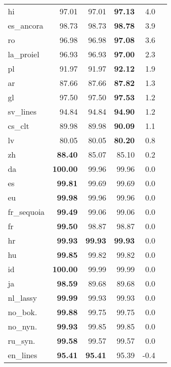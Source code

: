 \documentclass[11pt,a4paper]{article}
\begin{document}
\begin{table}[]
\begin{center}
\begin{tabular}{|l|r||r|r|r|r|}
hi          &      97.01  &     97.01  & \bf 97.13  &      4.0\\
es\_ancora  &      98.73  &     98.73  & \bf 98.78  &      3.9\\
ro          &      96.98  &     96.98  & \bf 97.08  &      3.6\\
la\_proiel  &      96.93  &     96.93  & \bf 97.00  &      2.3\\
pl          &      91.97  &     91.97  & \bf 92.12  &      1.9\\
ar          &      87.66  &     87.66  & \bf 87.82  &      1.3\\
gl          &      97.50  &     97.50  & \bf 97.53  &      1.2\\
sv\_lines   &      94.84  &     94.84  & \bf 94.90  &      1.2\\
cs\_clt     &      89.98  &     89.98  & \bf 90.09  &      1.1\\
lv          &      80.05  &     80.05  & \bf 80.20  &      0.8 \\
zh          & \bf  88.40  &     85.07  &     85.10  &      0.2\\
da          & \bf 100.00  &     99.96  &     99.96  &      0.0\\
es          & \bf  99.81  &     99.69  &     99.69  &      0.0\\
eu          & \bf  99.98  &     99.96  &     99.96  &      0.0\\
fr\_sequoia & \bf  99.49  &     99.06  &     99.06  &      0.0\\
fr          & \bf  99.50  &     98.87  &     98.87  &      0.0\\
hr          & \bf  99.93  & \bf 99.93  & \bf 99.93  &      0.0\\
hu          & \bf  99.85  &     99.82  &     99.82  &      0.0\\
id          & \bf 100.00  &     99.99  &     99.99  &      0.0\\
ja          & \bf  98.59  &     89.68  &     89.68  &      0.0\\
nl\_lassy   & \bf  99.99  &     99.93  &     99.93  &      0.0\\
no\_bok.    & \bf  99.88  &     99.75  &     99.75  &      0.0\\
no\_nyn.    & \bf  99.93  &     99.85  &     99.85  &      0.0\\
ru\_syn.    & \bf  99.58  &     99.57  &     99.57  &      0.0\\
en\_lines   & \bf  95.41  & \bf 95.41  &     95.39  &     -0.4\\

\end{tabular}
\end{center}
\end{table}
\end{document}
